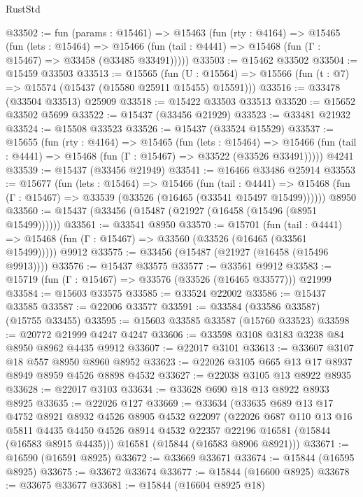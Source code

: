 \begin{lexlean}{RustStd}
\begin{coremodule}
@33502 := fun (params : @15461) =>
  @15463
    (fun (rty : @4164) =>
    @15465
      (fun (lets : @15464) =>
      @15466 (fun (tail : @4441) => @15468 (fun (Γ : @15467) => @33458 (@33485 @33491)))))
@33503 := @15462 @33502
@33504 := @15459 @33503
@33513 := @15565
    (fun (U : @15564) => @15566 (fun (t : @7) => @15574 (@15437 (@15580 @25911 @15455) @15591)))
@33516 := @33478 (@33504 @33513) @25909
@33518 := @15422 @33503 @33513
@33520 := @15652 @33502 @5699
@33522 := @15437 (@33456 @21929)
@33523 := @33481 @21932
@33524 := @15508 @33523
@33526 := @15437 (@33524 @15529)
@33537 := @15655
    (fun (rty : @4164) =>
    @15465
      (fun (lets : @15464) =>
      @15466 (fun (tail : @4441) => @15468 (fun (Γ : @15467) => @33522 (@33526 @33491)))))
    @4241
@33539 := @15437 (@33456 @21949)
@33541 := @16466 @33486 @25914
@33553 := @15677
    (fun (lets : @15464) =>
    @15466
      (fun (tail : @4441) =>
      @15468 (fun (Γ : @15467) => @33539 (@33526 (@16465 (@33541 @15497 @15499))))))
    @8950
@33560 := @15437 (@33456 (@15487 (@21927 (@16458 (@15496 (@8951 @15499))))))
@33561 := @33541 @8950
@33570 := @15701
    (fun (tail : @4441) => @15468 (fun (Γ : @15467) => @33560 (@33526 (@16465 (@33561 @15499)))))
    @9912
@33575 := @33456 (@15487 (@21927 (@16458 (@15496 @9913))))
@33576 := @15437 @33575
@33577 := @33561 @9912
@33583 := @15719 (fun (Γ : @15467) => @33576 (@33526 (@16465 @33577))) @21999
@33584 := @15603 @33575
@33585 := @33524 @22002
@33586 := @15437 @33585
@33587 := @22006 @33577
@33591 := @33584 (@33586 @33587) (@15755 @33455)
@33595 := @15603 @33585 @33587 (@15760 @33523)
@33598 := @20772 @21999 @4247 @4247
@33606 := @33598 @3108 @3183 @3238 @84 @8950 @8962 @4435 @9912
@33607 := @22017 @3101
@33613 := @33607 @3107 @18 @557 @8950 @8960 @8952
@33623 := @22026 @3105 @665 @13 @17 @8937 @8949 @8959 @4526 @8898 @4532
@33627 := @22038 @3105 @13 @8922 @8935
@33628 := @22017 @3103
@33634 := @33628 @690 @18 @13 @8922 @8933 @8925
@33635 := @22026 @127
@33669 := @33634
    (@33635
      @689
      @13
      @17
      @4752
      @8921
      @8932
      @4526
      @8905
      @4532
      @22097
      (@22026
        @687
        @110
        @13
        @16
        @5811
        @4435
        @4450
        @4526
        @8914
        @4532
        @22357
        @22196
        @16581
        (@15844 (@16583 @8915 @4435)))
      @16581
      (@15844 (@16583 @8906 @8921)))
@33671 := @16590 (@16591 @8925)
@33672 := @33669 @33671
@33674 := @15844 (@16595 @8925)
@33675 := @33672 @33674
@33677 := @15844 (@16600 @8925)
@33678 := @33675 @33677
@33681 := @15844 (@16604 @8925 @18)

\end{coremodule}
\end{lexlean}
